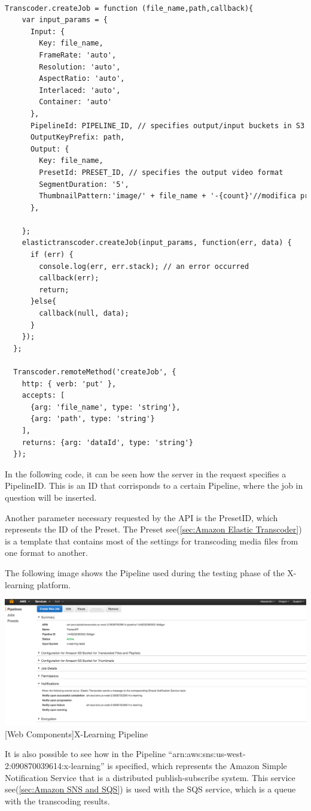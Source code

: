\begin{lstlisting}[language=html]
  
Transcoder.createJob = function (file_name,path,callback){
    var input_params = {
      Input: { 
        Key: file_name, 
        FrameRate: 'auto', 
        Resolution: 'auto', 
        AspectRatio: 'auto', 
        Interlaced: 'auto', 
        Container: 'auto' 
      }, 
      PipelineId: PIPELINE_ID, // specifies output/input buckets in S3 
      OutputKeyPrefix: path,
      Output: { 
        Key: file_name, 
        PresetId: PRESET_ID, // specifies the output video format
        SegmentDuration: '5',
        ThumbnailPattern:'image/' + file_name + '-{count}'//modifica preset per determinare il numero di immagini
      },

    };    
    elastictranscoder.createJob(input_params, function(err, data) {
      if (err) {
        console.log(err, err.stack); // an error occurred
        callback(err);
        return;
      }else{
        callback(null, data);
      }
    });
  };
  
  Transcoder.remoteMethod('createJob', {
    http: { verb: 'put' },
    accepts: [
      {arg: 'file_name', type: 'string'},
      {arg: 'path', type: 'string'}
    ],
    returns: {arg: 'dataId', type: 'string'}
  });
\end{lstlisting}

In the following code, it can be seen how the server in the request specifies a PipelineID. This is an ID that corrisponds to a certain Pipeline, where the job in question will be inserted.

Another parameter necessary requested by the API is the PresetID, which represents the ID of the Preset. The Preset see(\ref{sec:Amazon Elastic Transcoder}) is a template that contains most of the settings for transcoding media files from one format to another.

The following image shows the Pipeline used during the testing phase of the X-learning platform.

\begin{minipage}{\linewidth}
    \centering
    \includegraphics[width=1.0\linewidth]{images/chapter5/elastic_pipeline.png}
    [Web Components]{X-Learning Pipeline}
\end{minipage}
It is also possible to see how in the Pipeline “arn:aws:sns:us-west-2:090870039614:x-learning” is specified, which represents the Amazon Simple Notification Service that is a distributed publish-subscribe system. 
This service see(\ref{sec:Amazon SNS and SQS}) is used with the SQS service, which is a queue with the transcoding results.

